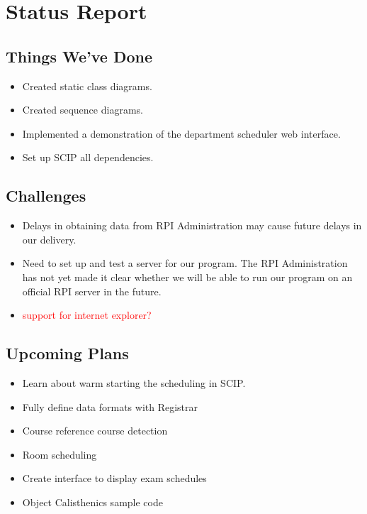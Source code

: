 \documentclass[11pt]{article}
\begin{document}
\section*{Status Report} %
\subsection{Things We've Done}
\begin{itemize}
	\item Created static class diagrams.
	\item Created sequence diagrams.
	\item Implemented a demonstration of the department scheduler web interface.
	\item Set up SCIP  all dependencies.
\end{itemize}

\subsection{Challenges}
\begin{itemize}
	\item Delays in obtaining data from RPI Administration may cause future delays in our delivery.
	\item Need to set up and test a server for our program. The RPI Administration has not yet made it clear whether we will be able to run our program on an official RPI server in the future.
	\item \textcolor{red}{support for internet explorer?}
\end{itemize}

\subsection{Upcoming Plans}
\begin{itemize}
	\item Learn about warm starting the scheduling in SCIP.
	\item Fully define data formats with Registrar
	\item Course reference course detection
	\item Room scheduling
	\item Create interface to display exam schedules 
	\item Object Calisthenics sample code
\end{itemize}
\end{document}
